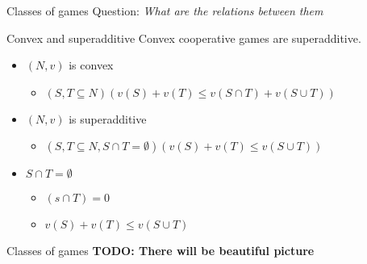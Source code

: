 \documentclass{beamer}
\begin{document}


\begin{frame}{Classes of games}
    Question: \textit{What are the relations between them}
	\begin{block}{Convex and superadditive}
		Convex cooperative games are superadditive.
	\end{block}
	\begin{itemize}
		\item $(N,v)$ is convex
		\begin{itemize}
			\item $\left(S,T \subseteq N\right)\left(v(S)+v(T) \leq v\left(S \cap T\right)+v\left(S \cup T\right)\right)$
		\end{itemize}
		\item $(N,v)$ is superadditive
		\begin{itemize}
			\item $\left(S,T \subseteq N, S \cap T = \emptyset\right)\left(v(S)+v(T) \leq v\left(S \cup T\right)\right)$
		\end{itemize}
		\item $S \cap T = \emptyset$
		\begin{itemize}
			\item $\left(s \cap T\right) = 0$
			\item $v(S)+v(T) \leq v\left(S \cup T\right)$
		\end{itemize}
	\end{itemize}
\end{frame}



\begin{frame}{Classes of games}
    \textbf{TODO: There will be beautiful picture}
\end{frame}


\end{document}
